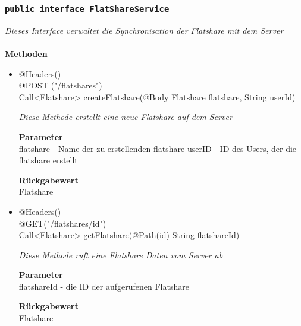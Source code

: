 	\subsubsection{\texttt{public interface  FlatShareService }}
\textit{Dieses Interface verwaltet die Synchronisation der Flatshare mit dem Server}\\
\\
	\textbf{Methoden} \\
		\begin{itemize}
		\item{@Headers()\\ @POST ("/flatshares") \\
Call<Flatshare> createFlatshare(@Body Flatshare flatshare, String userId)
}

		\textit{Diese Methode erstellt eine neue Flatshare auf dem Server
}

		\textbf{Parameter} \\
	flatshare - Name der zu erstellenden flatshare
	userID - ID des Users, der die flatshare erstellt

		\textbf{Rückgabewert} \\
	Flatshare

      \item{@Headers()\\  @GET("/flatshares/{id}")\\ Call<Flatshare> getFlatshare(@Path(\grqq id\grqq) 					String flatshareId)}

		\textit{Diese Methode ruft eine Flatshare Daten vom Server ab }

		\textbf{Parameter} \\
		flatshareId - die ID der aufgerufenen Flatshare 

		\textbf{Rückgabewert} \\
	Flatshare


	 \end{itemize}




